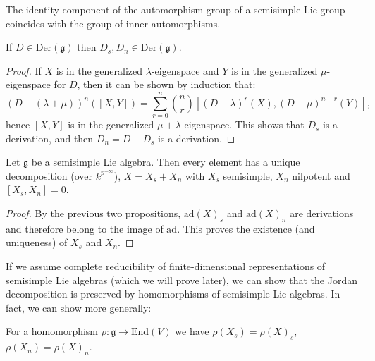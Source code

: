 \begin{proposition}
 The identity component of the automorphism group of a semisimple Lie group coincides with the group of inner automorphisms.
\end{proposition}



\begin{proposition}\label{isderivation}
 If $D\in \text{Der}(\mathfrak g)$ then $D_s,D_n\in\text{Der}(\mathfrak g)$.
\end{proposition}

\begin{proof}
 If $X$ is in the generalized $\lambda$-eigenspace and $Y$ is in the generalized $\mu$-eigenspace for $D$, then it can be shown by induction that:
$$ (D-(\lambda+\mu))^n([X,Y]) = \sum_{r=0}^n \binom{n}{r} [(D-\lambda)^r(X),(D-\mu)^{n-r}(Y)],$$
hence $[X,Y]$ is in the generalized $\mu+\lambda$-eigenspace. This shows that $D_s$ is a derivation, and then $D_n=D-D_s$ is a derivation.
\end{proof}

\begin{theorem}
 Let $\mathfrak g$ be a semisimple Lie algebra. Then every element has a unique decomposition (over $k^{p^{-\infty}}$), $X=X_s+X_n$ with $X_s$ semisimple, $X_n$ nilpotent and $[X_s,X_n]=0$. 
\end{theorem}

\begin{proof}
 By the previous two propositions, $\text{ad}(X)_s$ and $\text{ad}(X)_n$ are derivations and therefore belong to the image of $\text{ad}$. This proves the existence (and uniqueness) of $X_s$ and $X_n$. 
\end{proof}

If we assume complete reducibility of finite-dimensional representations of semisimple Lie algebras (which we will prove later), we can show that the Jordan decomposition is preserved by homomorphisms of semisimple Lie algebras. In fact, we can show more generally:

\begin{theorem}
 For a homomorphism $\rho:\mathfrak g\to \text{End}(V)$ we have $\rho(X_s)=\rho(X)_s$, $\rho(X_n)=\rho(X)_n$.
\end{theorem}

